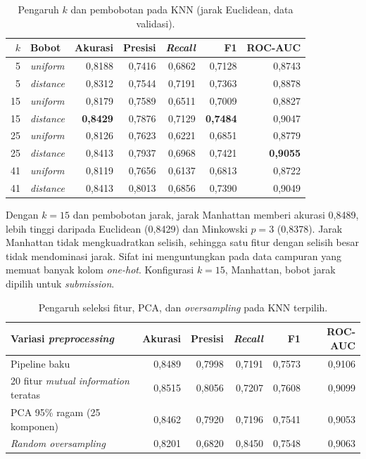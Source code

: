 \begin{table}[htbp]
    \centering
    \small
    \begin{tabular}{@{}r l r r r r r@{}}
        \toprule
        $k$ & Bobot & Akurasi & Presisi & \textit{Recall} & F1 & ROC-AUC \\
        \midrule
        5 & \textit{uniform} & 0,8188 & 0,7416 & 0,6862 & 0,7128 & 0,8743 \\
        5 & \textit{distance} & 0,8312 & 0,7544 & 0,7191 & 0,7363 & 0,8878 \\
        15 & \textit{uniform} & 0,8179 & 0,7589 & 0,6511 & 0,7009 & 0,8827 \\
        15 & \textit{distance} & \textbf{0,8429} & 0,7876 & 0,7129 & \textbf{0,7484} & 0,9047 \\
        25 & \textit{uniform} & 0,8126 & 0,7623 & 0,6221 & 0,6851 & 0,8779 \\
        25 & \textit{distance} & 0,8413 & 0,7937 & 0,6968 & 0,7421 & \textbf{0,9055} \\
        41 & \textit{uniform} & 0,8119 & 0,7656 & 0,6137 & 0,6813 & 0,8722 \\
        41 & \textit{distance} & 0,8413 & 0,8013 & 0,6856 & 0,7390 & 0,9049 \\
        \bottomrule
    \end{tabular}
    \caption{Pengaruh $k$ dan pembobotan pada KNN (jarak Euclidean, data validasi).}
    \label{tab:knn-grid}
\end{table}

Dengan $k=15$ dan pembobotan jarak, jarak Manhattan memberi akurasi 0,8489, lebih tinggi daripada Euclidean (0,8429) dan Minkowski $p=3$ (0,8378). Jarak Manhattan tidak mengkuadratkan selisih, sehingga satu fitur dengan selisih besar tidak mendominasi jarak. Sifat ini menguntungkan pada data campuran yang memuat banyak kolom \textit{one-hot}. Konfigurasi $k=15$, Manhattan, bobot jarak dipilih untuk \textit{submission}.

\begin{table}[htbp]
    \centering
    \small
    \begin{tabular}{@{}l r r r r r@{}}
        \toprule
        Variasi \textit{preprocessing} & Akurasi & Presisi & \textit{Recall} & F1 & ROC-AUC \\
        \midrule
        Pipeline baku & 0,8489 & 0,7998 & 0,7191 & 0,7573 & 0,9106 \\
        20 fitur \textit{mutual information} teratas & 0,8515 & 0,8056 & 0,7207 & 0,7608 & 0,9099 \\
        PCA 95\% ragam (25 komponen) & 0,8462 & 0,7920 & 0,7196 & 0,7541 & 0,9053 \\
        \textit{Random oversampling} & 0,8201 & 0,6820 & 0,8450 & 0,7548 & 0,9063 \\
        \bottomrule
    \end{tabular}
    \caption{Pengaruh seleksi fitur, PCA, dan \textit{oversampling} pada KNN terpilih.}
    \label{tab:knn-variasi}
\end{table}

